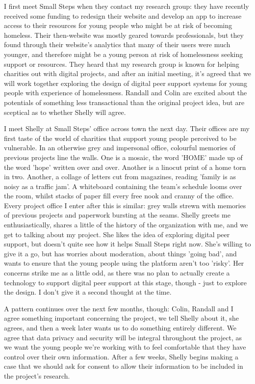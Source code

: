 I first meet Small Steps when they contact my research group: they have recently received some funding to redesign their website and develop an app to increase access to their resources for young people who might be at risk of becoming homeless. Their then-website was mostly geared towards professionals, but they found through their website's analytics that many of their users were much younger, and therefore might be a young person at risk of homelessness seeking support or resources. They heard that my research group is known for helping charities out with digital projects, and after an initial meeting, it's agreed that we will work together exploring the design of digital peer support systems for young people with experience of homelessness. Randall and Colin are excited about the potentials of something less transactional than the original project idea, but are sceptical as to whether Shelly will agree. 

I meet Shelly at Small Steps' office across town the next day. Their offices are my first taste of the world of charities that support young people perceived to be vulnerable. In an otherwise grey and impersonal office, colourful memories of previous projects line the walls. One is a mosaic, the word 'HOME' made up of the word 'hope' written over and over. Another is a linocut print of a home torn in two. Another, a collage of letters cut from magazines, reading 'family is as noisy as a traffic jam'. A whiteboard containing the team's schedule looms over the room, whilst stacks of paper fill every free nook and cranny of the office. Every project office I enter after this is similar: grey walls strewn with memories of previous projects and paperwork bursting at the seams. Shelly greets me enthusiastically, shares a little of the history of the organization with me, and we get to talking about my project. She likes the idea of exploring digital peer support, but doesn't quite see how it helps Small Steps right now. She's willing to give it a go, but has worries about moderation, about things 'going bad', and wants to ensure that the young people using the platform aren't too 'risky'. Her concerns strike me as a little odd, as there was no plan to actually create a technology to support digital peer support at this stage, though - just to explore the design. I don't give it a second thought at the time.

A pattern continues over the next few months, though: Colin, Randall and I agree something important concerning the project, we tell Shelly about it, she agrees, and then a week later wants us to do something entirely different. We agree that data privacy and security will be integral throughout the project, as we want the young people we're working with to feel comfortable that they have control over their own information. After a few weeks, Shelly begins making a case that we should ask for consent to allow their information to be included in the project's research. 


